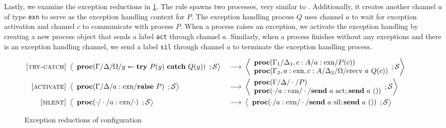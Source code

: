 \documentclass[12pt, openany]{memoir}
\newcommand*{\send}[2]{\textbf{send}\ #1\ #2}
\newcommand*{\craise}[1]{\textbf{raise}\ #1}
\newcommand*{\trycatch}[3]{#3 \twoheadleftarrow	\textbf{try}\ #1(#3)\ \textbf{catch}\ #2(#3)}
\newcommand*{\procObj}[4]{\textbf{proc}(#1/#2/#3/#4)}
\newcommand*{\cancelSet}[0]{\mathcal{S}}
\begin{document}
Lastly, we examine the exception reductions in \cref{fig:exnreduction}. 
The  rule spawns two processes, very similar to . 
Additionally, it creates another channel $a$ of type \texttt{exn} to serve as the exception handling context for $P$. 
The exception handling process $Q$ uses channel $a$ to wait for exception activation and channel $c$ to communicate with process $P$.
When a process raises an exception, we activate the exception handling by creating a new process object that sends a label \texttt{act} through channel $a$. 
Similarly, when a process finishes without any exceptions and there is an exception handling channel, we send a label \texttt{sil} through channel $a$ to terminate the exception handling process.
\begin{figure}[H]
  \begin{alignat}{4}
    \label{try-catch} \textsc{[try-catch]} & ~ 
    \Braket{
      \begin{array}{l}
        \procObj{\Gamma}{\Delta}{\Omega}{\trycatch{P}{Q}{y}}
      \end{array}
      ; \cancelSet
    } & ~ \longrightarrow & ~ 
    \Braket{
      \begin{array}{l}
        \procObj{\Gamma_1}{\Delta_1, c : A}{a : \text{exn}}{P(c)} \\
        \procObj{\Gamma_2, a : \text{exn}, c : A}{\Delta_2}{\Omega}{\text{erecv}\ a\ Q(c)}
      \end{array}
      ; \cancelSet
    } \tag*{} \\
    \label{activation} \textsc{[activate]} & ~ 
    \Braket{
      \begin{array}{l}
        \procObj{\Gamma}{\Delta}{a : \text{exn}}{\craise{P}}
      \end{array}
      ; \cancelSet
    } & ~ \longrightarrow & ~ 
    \Braket{
      \begin{array}{l}
        \procObj{\Gamma}{\Delta}{\cdot}{P} \\
        \procObj{\cdot}{a : \text{exn}}{\cdot}{\send{a}{\text{act}}; \send{a}{()}}
      \end{array}
      ; \cancelSet
    } \tag*{} \\
    \label{silence} \textsc{[silent]} & ~ 
    \Braket{
      \begin{array}{l}
        \procObj{\cdot}{\cdot}{a : \text{exn}}{\cdot}
      \end{array}
      ; \cancelSet
    } & ~ \longrightarrow & ~ 
    \Braket{
      \begin{array}{l}
        \procObj{\cdot}{a : \text{exn}}{\cdot}{\send{a}{\text{sil}}; \send{a}{()}}
      \end{array}
      ; \cancelSet
    } \tag*{}
  \end{alignat}
  \raggedleft
  \caption{Exception reductions of configuration}
  \label{fig:exnreduction}
\end{figure}
\end{document}
